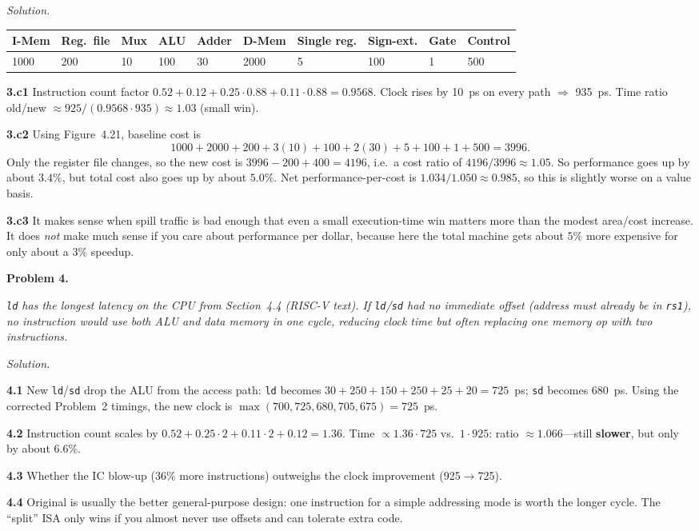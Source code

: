 \documentclass[12pt]{article}
\newcommand{\problem}[1]{\vspace{0.8em}\noindent\textbf{Problem #1.}\vspace{0.35em}}
\newenvironment{solution}{\par\noindent\textit{Solution.}\ }{\par\vspace{1.1em}}
\newcommand{\subproblem}[1]{\par\vspace{0.45em}\noindent\textbf{#1}\quad}
\newcommand{\assigntext}[1]{\par\vspace{0.25em}\small\textit{#1}\par\vspace{0.35em}}
\begin{document}
\begin{solution}
\begin{center}
\begin{tabular}{@{}llllllllll@{}}
\toprule
I-Mem & Reg.\ file & Mux & ALU & Adder & D-Mem & Single reg. & Sign-ext. & Gate & Control \\
\midrule
1000 & 200 & 10 & 100 & 30 & 2000 & 5 & 100 & 1 & 500 \\
\bottomrule
\end{tabular}
\end{center}

\subproblem{3.c1}
Instruction count factor $0.52+0.12+0.25\cdot0.88+0.11\cdot0.88=0.9568$. Clock rises by 10~ps on every path $\Rightarrow$ 935~ps. Time ratio old/new $\approx 925/(0.9568\cdot 935)\approx \mathbf{1.03}$ (small win).

\subproblem{3.c2}
Using Figure~4.21, baseline cost is
\[
1000 + 2000 + 200 + 3(10) + 100 + 2(30) + 5 + 100 + 1 + 500 = 3996.
\]
Only the register file changes, so the new cost is $3996-200+400=4196$, i.e.\ a cost ratio of
$4196/3996 \approx 1.05$.
So performance goes up by about $3.4\%$, but total cost also goes up by about $5.0\%$. Net performance-per-cost is
$1.034/1.050 \approx 0.985$, so this is slightly worse on a value basis.

\subproblem{3.c3}
It makes sense when spill traffic is bad enough that even a small execution-time win matters more than the modest area/cost increase. It does \emph{not} make much sense if you care about performance per dollar, because here the total machine gets about $5\%$ more expensive for only about a $3\%$ speedup.
\end{solution}

\problem{4}
\assigntext{\texttt{ld} has the longest latency on the CPU from Section~4.4 (RISC-V text). If \texttt{ld}/\texttt{sd} had no immediate offset (address must already be in \texttt{rs1}), no instruction would use both ALU and data memory in one cycle, reducing clock time but often replacing one memory op with two instructions.}

\begin{solution}
\subproblem{4.1}
New \texttt{ld}/\texttt{sd} drop the ALU from the access path: \texttt{ld} becomes $30+250+150+250+25+20=725$~ps; \texttt{sd} becomes $680$~ps. Using the corrected Problem~2 timings, the new clock is
$\max(700,725,680,705,675)=725$~ps.

\subproblem{4.2}
Instruction count scales by $0.52+0.25\cdot2+0.11\cdot2+0.12=1.36$. Time $\propto 1.36\cdot 725$ vs.\ $1\cdot 925$: ratio
$\approx 1.066$---still \textbf{slower}, but only by about $6.6\%$.

\subproblem{4.3}
Whether the IC blow-up (36\% more instructions) outweighs the clock improvement (925$\to$725).

\subproblem{4.4}
Original is usually the better general-purpose design: one instruction for a simple addressing mode is worth the longer cycle. The ``split'' ISA only wins if you almost never use offsets and can tolerate extra code.
\end{solution}
\end{document}
